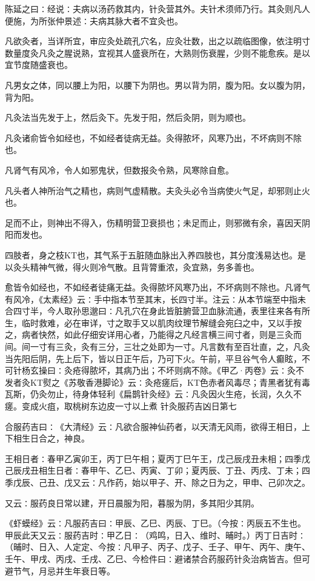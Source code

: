 \documentclass[a4paper,12pt,UTF8,twoside]{ctexbook}
\begin{document}
陈延之曰∶经说∶夫病以汤药救其内，针灸营其外。夫针术须师乃行。其灸则凡人便施，为所张仲景述∶夫病其脉大者不宜灸也。

凡欲灸者，当详所宜，审应灸处疏孔穴名，应灸壮数，出之以疏临图像，依注明寸数量度灸凡灸之腥说熟，宜视其人盛衰所在，大熟则伤衰腥，少则不能愈疾。是以宜节度随盛衰也。

凡男女之体，同以腰上为阳，以腰下为阴也。男以背为阴，腹为阳。女以腹为阴，背为阳。

凡灸法当先发于上，然后灸下。先发于阳，然后灸阴，则为顺也。

凡灸诸俞皆令如经也，不如经者徒病无益。灸得脓坏，风寒乃出，不坏病则不除也。

凡肾气有风冷，令人如邪鬼状，但数报灸令熟，风寒除自愈。

凡头者人神所治气之精也，病则气虚精散。夫灸头必令当病使火气足，却邪则止火也。

足而不止，则神出不得入，伤精明营卫衰损也；未足而止，则邪微有余，喜因天阴阳而发也。

四肢者，身之枝KT也，其气系于五脏随血脉出入养四肢也，其分度浅易达也。是以灸头精神气微，得火则冷气散。且背膂重浓，灸宜熟，务多善也。

愈皆令如经也，不如经者徒痛无益。灸得脓坏风寒乃出，不坏病则不除也。凡肾气有风冷，《太素经》云∶手中指本节至其末，长四寸半。注云∶从本节端至中指未合四寸半，今人取孙思邈曰∶凡孔穴在身此皆脏腑营卫血脉流通，表里往来各有所生，临时救难，必在审详，寸之取手又以肌肉纹理节解缝会宛臼之中，又以手按之，病者快然，如此仔细安详用心者，乃能得之凡经言横三间寸者，则是三灸而间。间一寸有三灸，灸有三分，三壮之处即为一寸。凡言数有至百壮直，之，凡灸当先阳后阴，先上后下，皆以日正午后，乃可下火。午前，平旦谷气令人癫眩，不可针杨玄操曰∶灸疮得脓坏，其病乃出；不坏则病不除。《甲乙·丙卷》云∶灸不发者灸KT熨之《苏敬香港脚论》云∶灸疮瘥后，KT色赤者风毒尽；青黑者犹有毒瓦斯，仍灸勿止，待身体轻利《扁鹊针灸经》云∶凡灸因火生疮，长润，久久不瘥。变成火疽，取桃树东边皮一寸以上煮
针灸服药吉凶日第七

合服药吉曰∶《大清经》云∶凡欲合服神仙药者，以天清无风雨，欲得王相日，上下相生日合之，神良。

王相日者∶春甲乙寅卯王，丙丁巳午相；夏丙丁巳午王，戊己辰戌丑未相；四季戊己辰戌丑相生日者∶春甲午、乙巳、丙寅、丁卯；夏丙辰、丁丑、丙戌、丁未；四季戊辰、己丑、戊又云∶凡作药，始以甲子、开、除之日为之，甲申、己卯次之。

又云∶服药良日常以建，开日晨服为阳，暮服为阴，多其阳少其阴。

《虾蟆经》云∶凡服药吉曰∶甲辰、乙巳、丙辰、丁巳。（今按∶丙辰五不生也。甲辰此天又云∶服药吉时∶甲乙日∶（鸡鸣，日入、维时、晡时。）丙丁日吉时∶（晡时、日入、人定定、今按∶凡甲子、丙子、戊子、壬子、甲午、丙午、庚午、壬午、甲戌、丙戌、壬戌、乙巳、今检件曰∶避诸禁合药服药针灸治病皆吉。但可避节气，月忌并生年衰日等。
\end{document}
